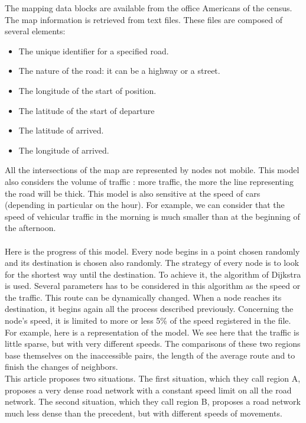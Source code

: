 The mapping data blocks are available from the office Americans of the census. The map information is retrieved from text files. These files are composed of several elements:

\begin{itemize}
\item The unique identifier for a specified road.
\item The nature of the road: it can be a highway or a street.
\item The longitude of the start of position.
\item The latitude of the start of departure
\item The latitude of arrived.
\item The longitude of arrived.
\end{itemize}

All the intersections of the map are represented by nodes not mobile.
This model also considers the volume of traffic : more traffic, the more the line representing the road will be thick.
This model is also sensitive at the speed of cars (depending in particular on the hour). For example, we can consider that the speed of vehicular traffic in the morning is much smaller than at the beginning of the afternoon.\\\\

Here is the progress of this model. Every node begins in a point chosen randomly and its destination is chosen also randomly. The strategy of every node is to look for the shortest way until the destination. To achieve it, the algorithm of Dijkstra is used. Several parameters has to be considered in this algorithm as the speed or the traffic. This route can be dynamically changed. When a node reaches its destination, it begins again all the process described previously. Concerning the node's speed, it is limited to more or less 5\% of the speed registered in the file.\\
For example, here is a representation of the model. We see here that the traffic is little sparse, but with very different speeds. The comparisons of these two regions base themselves on the inaccessible pairs, the length of the average route and to finish the changes of neighbors.\\

This article proposes two situations.
The first situation, which they call region A, proposes a very dense road network with a constant speed limit on all the road network. The second situation, which they call region B, proposes a road network much less dense than the precedent, but with different speeds of movements.

